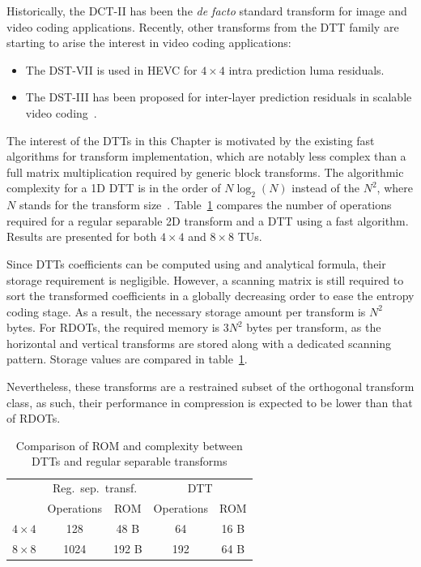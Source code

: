\documentclass[11pt,a4paper,openright,twoside]{book}
\numberwithin{equation}{section} %
\numberwithin{figure}{section} %
\numberwithin{table}{section} %
\begin{document}
Historically, the \ac{DCT}-II has been the \emph{de facto} standard transform
for image and video coding applications.
Recently, other transforms from the \ac{DTT} family are starting to arise the
interest in video coding applications:
\begin{itemize}
	\item The \ac{DST}-VII is used in \ac{HEVC} for $4\times4$ intra
		prediction luma residuals.
	\item The \ac{DST}-III has been proposed for inter-layer prediction
		residuals in scalable video
		coding~\cite{guo-14-transform-inter-layer-scalable}.
\end{itemize}

The interest of the \acp{DTT} in this Chapter is motivated by the existing
fast algorithms for transform implementation, which are notably less complex
than a full matrix multiplication required by generic block transforms.
The algorithmic complexity for a 1D \ac{DTT} is in the order of $N\log_2(N)$
instead of the $N^2$, where $N$ stands for the transform
size~\cite{puschel-08-algorithms-dct-dst}.
Table~\ref{tab:comparison_dtt_separable} compares the number of operations
required for a regular separable 2D transform and a \ac{DTT} using a fast
algorithm.
Results are presented for both $4\times4$ and $8\times8$ \acp{TU}.

Since \acp{DTT} coefficients can be computed using and analytical formula,
their storage requirement is negligible.
However, a scanning matrix is still required to sort the transformed
coefficients in a globally decreasing order to ease the entropy coding stage.
As a result, the necessary storage amount per transform is $N^2$ bytes.
For \acp{RDOT}, the required memory is $3N^2$ bytes per transform, as the
horizontal and vertical transforms are stored along with a dedicated scanning
pattern.
Storage values are compared in table~\ref{tab:comparison_dtt_separable}.

Nevertheless, these transforms are a restrained subset of the orthogonal
transform class, as such, their performance in compression is expected to be
lower than that of \acp{RDOT}.

\begin{table}[tb]
	\centering
	\small
	\begin{tabular}{c|cc|cc}
		\multirow{2}{2cm}{\diagbox{Size}{Type}} &
		\multicolumn{2}{c|}{Reg.\ sep.\ transf.} &
		\multicolumn{2}{c}{\acs{DTT}} \\
		& Operations & \acs{ROM} & Operations & \acs{ROM} \\
		\hline
		$4\times4$ &  128 &  48 B &  64 & 16 B \\
		$8\times8$ & 1024 & 192 B & 192 & 64 B \\
	\end{tabular}
	\caption{Comparison of \acs{ROM} and complexity between \acsp{DTT} and
	regular separable transforms}
	\label{tab:comparison_dtt_separable}
\end{table}
\end{document}
